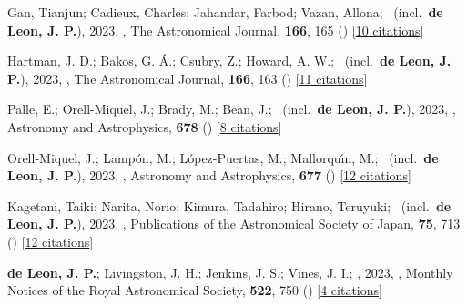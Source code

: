 \item[{\color{numcolor}\scriptsize56}] Gan, Tianjun; Cadieux, Charles; Jahandar, Farbod; Vazan, Allona; \etal\ (incl.\ \textbf{de Leon, J. P.}), 2023, , The Astronomical Journal, \textbf{166}, 165 () [\href{https://ui.adsabs.harvard.edu/abs/2023AJ....166..165G}{10 citations}]

\item[{\color{numcolor}\scriptsize55}] Hartman, J. D.; Bakos, G. {\'A}.; Csubry, Z.; Howard, A. W.; \etal\ (incl.\ \textbf{de Leon, J. P.}), 2023, , The Astronomical Journal, \textbf{166}, 163 () [\href{https://ui.adsabs.harvard.edu/abs/2023AJ....166..163H}{11 citations}]

\item[{\color{numcolor}\scriptsize54}] Palle, E.; Orell-Miquel, J.; Brady, M.; Bean, J.; \etal\ (incl.\ \textbf{de Leon, J. P.}), 2023, , Astronomy and Astrophysics, \textbf{678} () [\href{https://ui.adsabs.harvard.edu/abs/2023A&A...678A..80P}{8 citations}]

\item[{\color{numcolor}\scriptsize53}] Orell-Miquel, J.; Lamp{\'o}n, M.; L{\'o}pez-Puertas, M.; Mallorqu{\'\i}n, M.; \etal\ (incl.\ \textbf{de Leon, J. P.}), 2023, , Astronomy and Astrophysics, \textbf{677} () [\href{https://ui.adsabs.harvard.edu/abs/2023A&A...677A..56O}{12 citations}]

\item[{\color{numcolor}\scriptsize52}] Kagetani, Taiki; Narita, Norio; Kimura, Tadahiro; Hirano, Teruyuki; \etal\ (incl.\ \textbf{de Leon, J. P.}), 2023, , Publications of the Astronomical Society of Japan, \textbf{75}, 713 () [\href{https://ui.adsabs.harvard.edu/abs/2023PASJ...75..713K}{12 citations}]

\item[{\color{numcolor}\scriptsize51}] \textbf{de Leon, J. P.}; Livingston, J. H.; Jenkins, J. S.; Vines, J. I.; \etal, 2023, , Monthly Notices of the Royal Astronomical Society, \textbf{522}, 750 () [\href{https://ui.adsabs.harvard.edu/abs/2023MNRAS.522..750D}{4 citations}]


